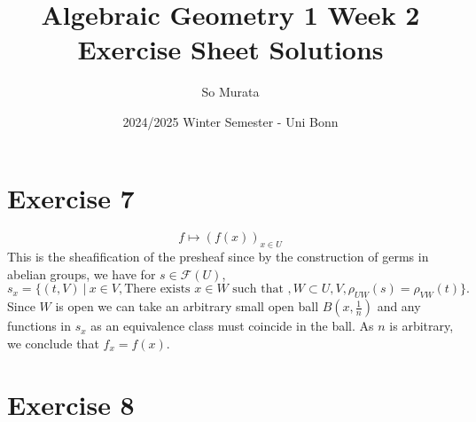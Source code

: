 \documentclass{article}
\title{Algebraic Geometry 1 Week 2 Exercise Sheet Solutions}
\author{So Murata}
\date{2024/2025 Winter Semester - Uni Bonn}
\begin{document}
\maketitle

\section*{Exercise 7}
\begin{equation*}
f\mapsto (f(x))_{x\in U}
\end{equation*}
This is the sheafification of the presheaf since by the construction of germs in abelian groups, we have for $s\in\mathcal{F}(U)$,
\begin{equation*}
s_x = \{(t,V)\:|\: x\in V, \text{There exists } x\in W \text{ such that }, W\subset U,V, \rho_{UW}(s) = \rho_{VW}(t)\}.
\end{equation*}
Since $W$ is open we can take an arbitrary small open ball $B(x,{\frac 1 n})$ and any functions in $s_x$ as an equivalence class must coincide in the ball. As $n$ is arbitrary, we conclude that $f_x = f(x)$.

\section*{Exercise 8}
\end{document}
